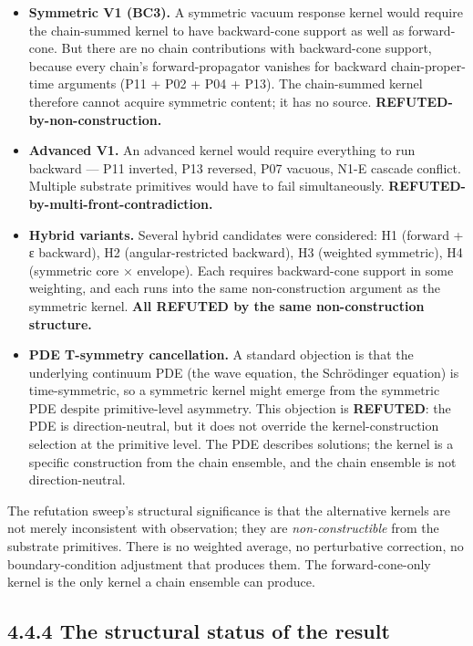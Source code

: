 \documentclass[11pt]{book}
\begin{document}
\begin{itemize}
\item \textbf{Symmetric V1 (BC3).} A symmetric vacuum response kernel would require the chain-summed kernel to have backward-cone support as well as forward-cone. But there are no chain contributions with backward-cone support, because every chain's forward-propagator vanishes for backward chain-proper-time arguments (P11 + P02 + P04 + P13). The chain-summed kernel therefore cannot acquire symmetric content; it has no source. \textbf{REFUTED-by-non-construction.}
\item \textbf{Advanced V1.} An advanced kernel would require everything to run backward — P11 inverted, P13 reversed, P07 vacuous, N1-E cascade conflict. Multiple substrate primitives would have to fail simultaneously. \textbf{REFUTED-by-multi-front-contradiction.}
\item \textbf{Hybrid variants.} Several hybrid candidates were considered: H1 (forward + ε backward), H2 (angular-restricted backward), H3 (weighted symmetric), H4 (symmetric core × envelope). Each requires backward-cone support in some weighting, and each runs into the same non-construction argument as the symmetric kernel. \textbf{All REFUTED by the same non-construction structure.}
\item \textbf{PDE T-symmetry cancellation.} A standard objection is that the underlying continuum PDE (the wave equation, the Schrödinger equation) is time-symmetric, so a symmetric kernel might emerge from the symmetric PDE despite primitive-level asymmetry. This objection is \textbf{REFUTED}: the PDE is direction-neutral, but it does not override the kernel-construction selection at the primitive level. The PDE describes solutions; the kernel is a specific construction from the chain ensemble, and the chain ensemble is not direction-neutral.
\end{itemize}

The refutation sweep's structural significance is that the alternative kernels are not merely inconsistent with observation; they are \textit{non-constructible} from the substrate primitives. There is no weighted average, no perturbative correction, no boundary-condition adjustment that produces them. The forward-cone-only kernel is the only kernel a chain ensemble can produce.

\subsection{4.4.4 The structural status of the result}
\end{document}
